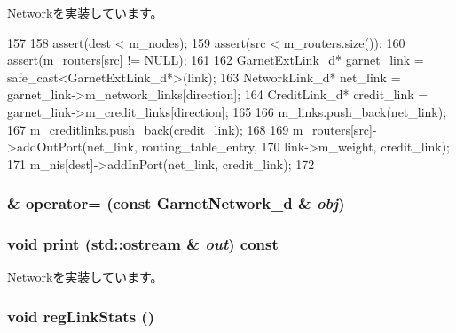 \hyperlink{classNetwork_a4e62c2a0e4a511dae2e9870a3d305719}{Network}を実装しています。


\begin{DoxyCode}
157 {
158     assert(dest < m_nodes);
159     assert(src < m_routers.size());
160     assert(m_routers[src] != NULL);
161 
162     GarnetExtLink_d* garnet_link = safe_cast<GarnetExtLink_d*>(link);
163     NetworkLink_d* net_link = garnet_link->m_network_links[direction];
164     CreditLink_d* credit_link = garnet_link->m_credit_links[direction];
165 
166     m_links.push_back(net_link);
167     m_creditlinks.push_back(credit_link);
168 
169     m_routers[src]->addOutPort(net_link, routing_table_entry,
170                                          link->m_weight, credit_link);
171     m_nis[dest]->addInPort(net_link, credit_link);
172 }
\end{DoxyCode}
\hypertarget{classGarnetNetwork__d_a1192f4f0aec8b0108dfb92ae40bc11a2}{
\subsubsection[{operator=}]{\& operator= (const {\bf GarnetNetwork\_\-d} \& {\em obj})}}
\label{classGarnetNetwork__d_a1192f4f0aec8b0108dfb92ae40bc11a2}
\hypertarget{classGarnetNetwork__d_ac55fe386a101fbae38c716067c9966a0}{
\subsubsection[{print}]{\setlength{\rightskip}{0pt plus 5cm}void print (std::ostream \& {\em out}) const}}
\label{classGarnetNetwork__d_ac55fe386a101fbae38c716067c9966a0}


\hyperlink{classNetwork_a3ea5f7af5db62cc24f4e40df9ea5c971}{Network}を実装しています。\hypertarget{classGarnetNetwork__d_a3fcf827957b65768909aa68853debf50}{
\subsubsection[{regLinkStats}]{\setlength{\rightskip}{0pt plus 5cm}void regLinkStats ()}}
\label{classGarnetNetwork__d_a3fcf827957b65768909aa68853debf50}




